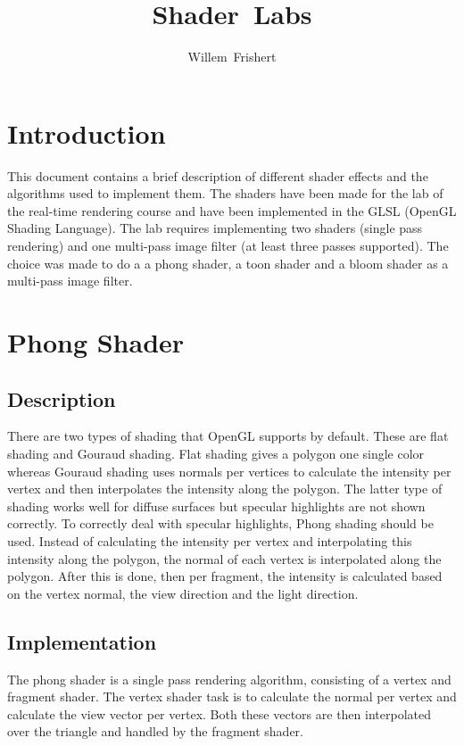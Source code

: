 \documentclass[a4paper,12pt]{article}
\author{Willem~Frishert}
\title{Shader~Labs}
\begin{document}
\pagestyle{headings}
\maketitle

\section{Introduction}
\label{sec:Introduction}
This document contains a brief description of different shader effects and the algorithms used to implement them. The shaders have been made for the lab of the real-time rendering course and have been implemented in the GLSL (OpenGL Shading Language). The lab requires implementing two shaders (single pass rendering) and one multi-pass image filter (at least three passes supported). The choice was made to do a a phong shader, a toon shader and a bloom shader as a multi-pass image filter.

\section{Phong Shader}
\label{sec:PhongShader}
\subsection{Description}
\label{sec:Description}

There are two types of shading that OpenGL supports by default. These are flat shading and Gouraud shading. Flat shading gives a polygon one single color whereas Gouraud shading uses normals per vertices to calculate the intensity per vertex and then interpolates the intensity along the polygon. The latter type of shading works well for diffuse surfaces but specular highlights are not shown correctly. To correctly deal with specular highlights, Phong shading should be used. Instead of calculating the intensity per vertex and interpolating this intensity along the polygon, the normal of each vertex is interpolated along the polygon. After this is done, then per fragment, the intensity is calculated based on the vertex normal, the view direction and the light direction.


\subsection{Implementation}
\label{sec:ImplementationPhongShader}

The phong shader is a single pass rendering algorithm, consisting of a vertex and fragment shader. The vertex shader task is to calculate the normal per vertex and calculate the view vector per vertex. Both these vectors are then interpolated over the triangle and handled by the fragment shader.
\end{document}
